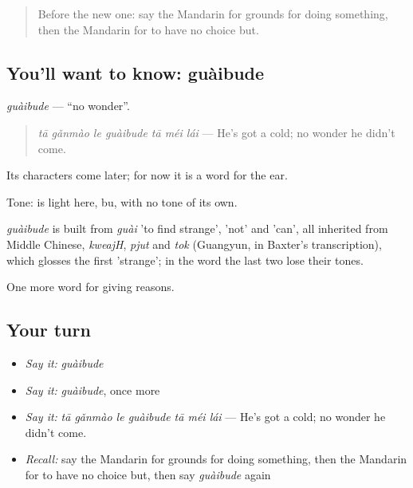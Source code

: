 \label{lesson:ZH-C235-guaibude}



\begin{quote}
Before the new one: say the Mandarin for grounds for doing something, then the Mandarin for to have no choice but.
\end{quote}

\subsection*{You'll want to know: guàibude}
\emph{guàibude} — \textquotedblleft{}no wonder\textquotedblright{}.

\begin{quote}
\emph{tā gǎnmào le guàibude tā méi lái} — He's got a cold; no wonder he didn't come.
\end{quote}

Its characters come later; for now it is a word for the ear.

Tone:  is light here, bu, with no tone of its own.

\begin{cousinweb}
\emph{guàibude} is built from \emph{guài} 'to find strange',  'not' and  'can', all inherited from Middle Chinese, \emph{kweajH}, \emph{pjut} and \emph{tok} (Guangyun, in Baxter's transcription), which glosses the first 'strange'; in the word the last two lose their tones.
\end{cousinweb}

\begin{grammarlens}[title={What you've built}]
One more word for giving reasons.
\end{grammarlens}

\subsection*{Your turn}
\begin{itemize}
\raggedright
  \item \emph{Say it:} \emph{guàibude}
  \item \emph{Say it:} \emph{guàibude}, once more
  \item \emph{Say it:} \emph{tā gǎnmào le guàibude tā méi lái} — He's got a cold; no wonder he didn't come.
  \item \emph{Recall:} say the Mandarin for grounds for doing something, then the Mandarin for to have no choice but, then say \emph{guàibude} again
\end{itemize}

